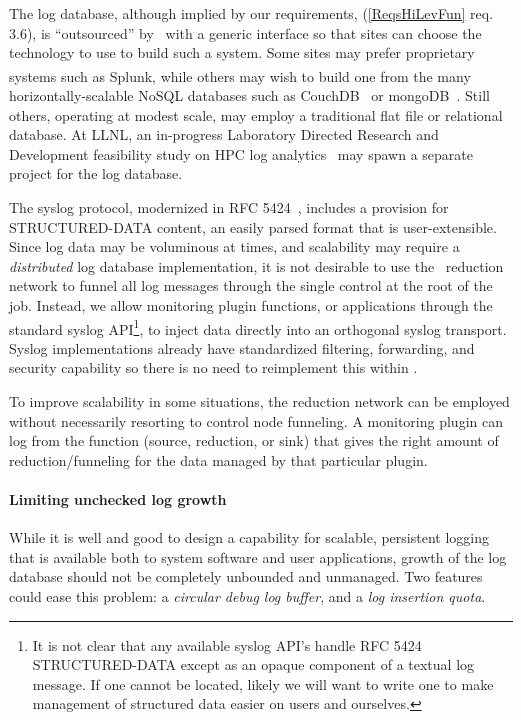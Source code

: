 The log database, although implied by our requirements, 
(\ref{ReqsHiLevFun} req. 3.6), is ``outsourced'' by \ngrm\ with
a generic interface so that sites can choose the technology
to use to build such a system.  Some sites may prefer proprietary
systems such as Splunk\textsuperscript{\textregistered}, while others may
wish to build one from the many horizontally-scalable NoSQL databases
such as CouchDB~\cite{CouchDB} or mongoDB~\cite{MongoDB}.
Still others, operating at modest scale, may employ a traditional flat
file or relational database.  At LLNL, an in-progress Laboratory
Directed Research and Development feasibility study on HPC log
analytics~\cite{LogLDRD} may spawn a separate project for the log database.

The syslog protocol, modernized in RFC 5424~\cite{rfc5424},
includes a provision for STRUCTURED-DATA content,
an easily parsed format that is user-extensible.
Since log data may be voluminous at times, and scalability may require
a {\em distributed} log database implementation, it is not desirable to
use the \ngrm\ reduction network to funnel all log messages through the
single control at the root of the job.  Instead, we allow monitoring
plugin functions, or applications through the standard syslog
API\footnote{It is not clear that any available syslog API's handle
RFC 5424 STRUCTURED-DATA except as an opaque component of a textual
log message.  If one cannot be located, likely we will want to write
one to make management of structured data easier on users and ourselves.},
to inject data directly into an orthogonal syslog transport.
Syslog implementations already have standardized filtering, forwarding,
and security capability so there is no need to reimplement this within \ngrm.

To improve scalability in some situations, the reduction network can be
employed without necessarily resorting to control node funneling.
A monitoring plugin can log from the function (source, reduction, or sink)
that gives the right amount of reduction/funneling for the data managed
by that particular plugin.

\paragraph{Limiting unchecked log growth}
While it is well and good to design a capability for scalable, persistent
logging that is available both to system software and user applications,
growth of the log database should not be completely unbounded and unmanaged.
Two features could ease this problem: a {\em circular debug log buffer}, and
a {\em log insertion quota}.

